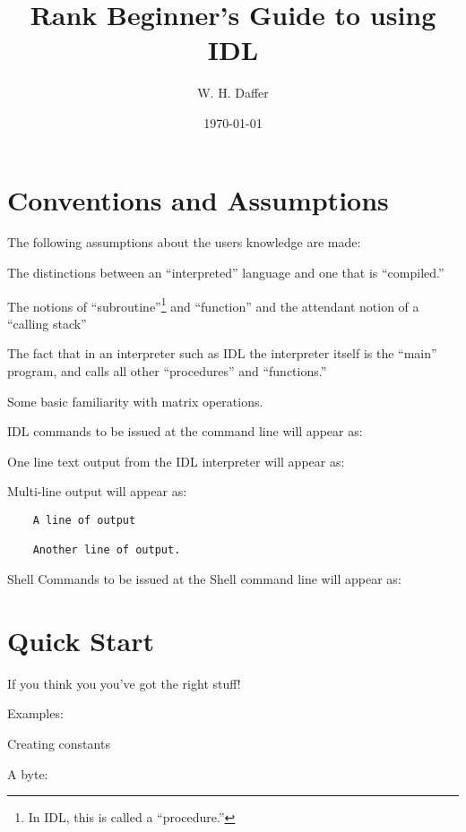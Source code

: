 \documentclass{article}
\title{Rank Beginner's Guide to using IDL}
\author{W. H. Daffer}
\date{\today}
\begin{document}
\maketitle

\section{Conventions and Assumptions}

  The following assumptions about the users knowledge are made:

\bi
  \item The distinctions between an ``interpreted'' language and one
        that is ``compiled.'' 
  \item The notions of ``subroutine''\footnote{In IDL, this is called
        a ``procedure.''} and ``function'' and the attendant notion of
        a ``calling stack''
  \item The fact that in an interpreter such as IDL the interpreter
        itself is the ``main'' program, and calls all other
        ``procedures'' and ``functions.''
  \item Some basic familiarity with matrix operations.
\ei


 IDL commands to be issued at the command line will appear as:


  One line text output from the IDL interpreter will appear as:


  Multi-line output will appear as:

  \begin{verbatim}
	A line of output

	Another line of output.

  \end{verbatim}


  Shell Commands to be issued at the Shell command line will appear as:
 


\newpage
\section{Quick Start}

  If you think you you've got the right stuff!

  Examples:

\bi
  \item Creating constants
   
     A byte:
\end{document}
